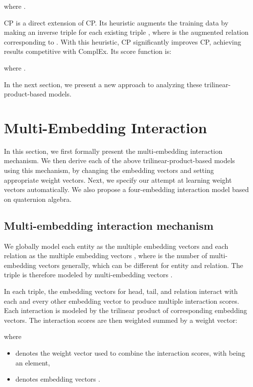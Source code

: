 \documentclass[sigconf,edbt]{acmart-edbt2019}
\begin{document}
where .

CP \cite{lacroix_canonicaltensordecomposition_2018} is a direct extension of CP. Its heuristic augments the training data by making an inverse triple  for each existing triple , where  is the augmented relation corresponding to . With this heuristic, CP significantly improves CP, achieving results competitive with ComplEx. Its score function is:

where .

In the next section, we present a new approach to analyzing these trilinear-product-based models.

\section{Multi-Embedding Interaction} \label{sect:method}
In this section, we first formally present the multi-embedding interaction mechanism. We then derive each of the above trilinear-product-based models using this mechanism, by changing the embedding vectors and setting appropriate weight vectors. Next, we specify our attempt at learning weight vectors automatically. We also propose a four-embedding interaction model based on quaternion algebra.

\subsection{Multi-embedding interaction mechanism}
We globally model each entity  as the multiple embedding vectors  and each relation  as the multiple embedding vectors , where  is the number of multi-embedding vectors generally, which can be different for entity and relation. The triple  is therefore modeled by multi-embedding vectors .

In each triple, the embedding vectors for head, tail, and relation interact with each and every other embedding vector to produce multiple interaction scores. Each interaction is modeled by the trilinear product of corresponding embedding vectors. The interaction scores are then weighted summed by a weight vector:

where 
\begin{itemize}
	\item  denotes the weight vector used to combine the interaction scores, with  being an element,
	\item  denotes embedding vectors .
\end{itemize}
\end{document}
